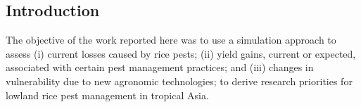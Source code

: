 \subsection{Introduction}


 
 
The objective of the work reported here was to use a simulation  approach to assess (i) current losses caused by rice pests; (ii)  yield gains, current or expected, associated with certain pest management practices; and (iii) changes in vulnerability due to new  agronomic technologies; to derive research priorities for lowland  rice pest management in tropical Asia.


